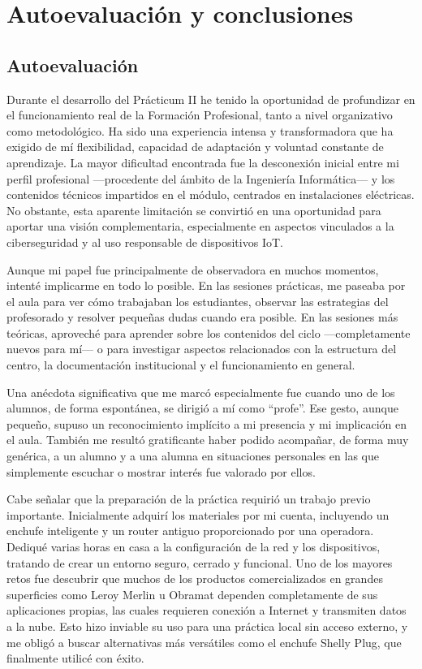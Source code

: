 \chapter{Autoevaluación y conclusiones}


\section{Autoevaluación}

Durante el desarrollo del Prácticum II he tenido la oportunidad de profundizar en el funcionamiento real de la Formación Profesional, tanto a nivel organizativo como metodológico. Ha sido una experiencia intensa y transformadora que ha exigido de mí flexibilidad, capacidad de adaptación y voluntad constante de aprendizaje. La mayor dificultad encontrada fue la desconexión inicial entre mi perfil profesional —procedente del ámbito de la Ingeniería Informática— y los contenidos técnicos impartidos en el módulo, centrados en instalaciones eléctricas. No obstante, esta aparente limitación se convirtió en una oportunidad para aportar una visión complementaria, especialmente en aspectos vinculados a la ciberseguridad y al uso responsable de dispositivos IoT.

Aunque mi papel fue principalmente de observadora en muchos momentos, intenté implicarme en todo lo posible. En las sesiones prácticas, me paseaba por el aula para ver cómo trabajaban los estudiantes, observar las estrategias del profesorado y resolver pequeñas dudas cuando era posible. En las sesiones más teóricas, aproveché para aprender sobre los contenidos del ciclo —completamente nuevos para mí— o para investigar aspectos relacionados con la estructura del centro, la documentación institucional y el funcionamiento en general.

Una anécdota significativa que me marcó especialmente fue cuando uno de los alumnos, de forma espontánea, se dirigió a mí como “profe”. Ese gesto, aunque pequeño, supuso un reconocimiento implícito a mi presencia y mi implicación en el aula. También me resultó gratificante haber podido acompañar, de forma muy genérica, a un alumno y a una alumna en situaciones personales en las que simplemente escuchar o mostrar interés fue valorado por ellos.

Cabe señalar que la preparación de la práctica requirió un trabajo previo importante. Inicialmente adquirí los materiales por mi cuenta, incluyendo un enchufe inteligente y un router antiguo proporcionado por una operadora. Dediqué varias horas en casa a la configuración de la red y los dispositivos, tratando de crear un entorno seguro, cerrado y funcional. Uno de los mayores retos fue descubrir que muchos de los productos comercializados en grandes superficies como Leroy Merlin u Obramat dependen completamente de sus aplicaciones propias, las cuales requieren conexión a Internet y transmiten datos a la nube. Esto hizo inviable su uso para una práctica local sin acceso externo, y me obligó a buscar alternativas más versátiles como el enchufe Shelly Plug, que finalmente utilicé con éxito.


